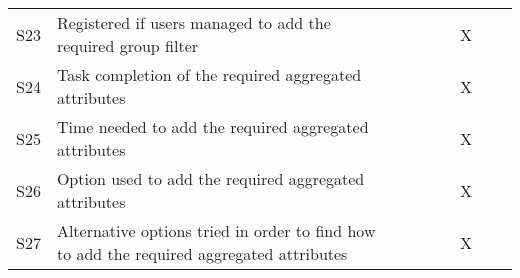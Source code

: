 \begin{longtable}{@{}lm{7cm}ccccccc@{}}
    S23         & Registered if users managed to add the required group filter                                                                                            &                                                &                                                &                                                &                                                & X                                              &                                                &                                                \\
    S24         & Task completion of the required aggregated attributes                                                                                                   &                                                &                                                &                                                &                                                & X                                              &                                                &                                                \\
    S25         & Time needed to add the required aggregated attributes                                                                                                   &                                                &                                                &                                                &                                                & X                                              &                                                &                                                \\
    S26         & Option used to add the required aggregated attributes                                                                                                   &                                                &                                                &                                                &                                                & X                                              &                                                &                                                \\
    S27         & Alternative options tried in order to find how to add the required aggregated attributes                                                                &                                                &                                                &                                                &                                                & X                                              &                                                &                                                \\

\end{longtable}
